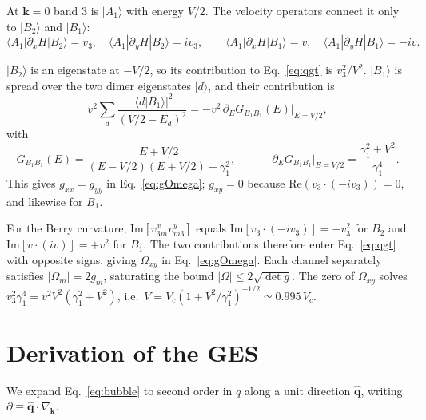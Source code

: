 \documentclass[11pt,a4paper]{article}
\numberwithin{equation}{section}
\newcommand{\bk}{\mathbf{k}}
\begin{document}
At $\bk=0$ band 3 is $|A_1\rangle$ with energy $V/2$. The velocity operators connect it only to $|B_2\rangle$ and $|B_1\rangle$:
\begin{equation}
\langle A_1|\partial_xH|B_2\rangle=v_3,\quad \langle A_1|\partial_yH|B_2\rangle=iv_3,\qquad
\langle A_1|\partial_xH|B_1\rangle=v,\quad \langle A_1|\partial_yH|B_1\rangle=-iv .
\end{equation}

$|B_2\rangle$ is an eigenstate at $-V/2$, so its contribution to Eq.~\eqref{eq:qgt} is $v_3^2/V^2$. $|B_1\rangle$ is spread over the two dimer eigenstates $|d\rangle$, and their contribution is
\begin{equation}
v^2\sum_d\frac{|\langle d|B_1\rangle|^2}{(V/2-E_d)^2}=-v^2\,\partial_EG_{B_1B_1}(E)\Big|_{E=V/2},
\end{equation}
with
\begin{equation}
G_{B_1B_1}(E)=\frac{E+V/2}{(E-V/2)(E+V/2)-\gamma_1^2},\qquad
-\partial_EG_{B_1B_1}\Big|_{E=V/2}=\frac{\gamma_1^2+V^2}{\gamma_1^4}.
\end{equation}
This gives $g_{xx}=g_{yy}$ in Eq.~\eqref{eq:gOmega}; $g_{xy}=0$ because $\mathrm{Re}(v_3\cdot(-iv_3))=0$, and likewise for $B_1$.

For the Berry curvature, $\mathrm{Im}[v^x_{3m}v^y_{m3}]$ equals $\mathrm{Im}[v_3\cdot(-iv_3)]=-v_3^2$ for $B_2$ and $\mathrm{Im}[v\cdot(iv)]=+v^2$ for $B_1$. The two contributions therefore enter Eq.~\eqref{eq:qgt} with opposite signs, giving $\Omega_{xy}$ in Eq.~\eqref{eq:gOmega}. Each channel separately satisfies $|\Omega_m|=2g_m$, saturating the bound $|\Omega|\le2\sqrt{\det g}$. The zero of $\Omega_{xy}$ solves $v_3^2\gamma_1^4=v^2V^2(\gamma_1^2+V^2)$, i.e.\ $V=V_c(1+V^2/\gamma_1^2)^{-1/2}\simeq0.995\,V_c$.

\section{Derivation of the GES}\label{app:ges}

We expand Eq.~\eqref{eq:bubble} to second order in $q$ along a unit direction $\hat{\mathbf q}$, writing $\partial\equiv\hat{\mathbf q}\cdot\nabla_{\bk}$.
\end{document}
